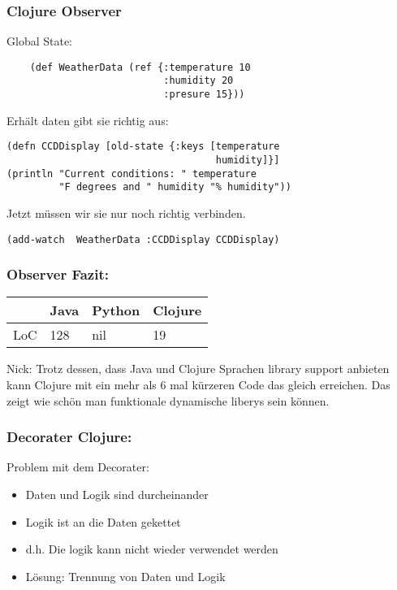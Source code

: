 \documentclass[compress, blue]{beamer}
\begin{document}
\begin{frame}[fragile]\frametitle{Clojure Observer}

Global State:
  \begin{lstlisting}
    (def WeatherData (ref {:temperature 10 
                           :humidity 20 
                           :presure 15}))
  \end{lstlisting}
\pause
Erhält daten gibt sie richtig aus:
\pause
\begin{lstlisting}
(defn CCDDisplay [old-state {:keys [temperature 
                                    humidity]}]
(println "Current conditions: " temperature 
         "F degrees and " humidity "% humidity"))
\end{lstlisting}
\pause
Jetzt müssen wir sie nur noch richtig verbinden.
\pause
\begin{lstlisting}
(add-watch  WeatherData :CCDDisplay CCDDisplay)
\end{lstlisting}
\end{frame}






\begin{frame}\frametitle{Observer Fazit:}
    \begin{tabular}{l | l l l}
     & Java &  Python & Clojure  \\
     \hline
    LoC & 128 &  nil & 19  \\
  \end{tabular}
  
  \begin{block}{Nick:}
    Trotz dessen, dass Java und Clojure Sprachen library support anbieten kann
    Clojure mit ein mehr als 6 mal kürzeren Code das gleich
    erreichen. Das zeigt wie schön man funktionale dynamische liberys
    sein können.
  \end{block}
\end{frame}





\begin{frame}\frametitle{Decorater Clojure:}

  \begin{block}{Problem mit dem Decorater:}
    \begin{itemize}
    \item Daten und Logik sind durcheinander
    \item Logik ist an die Daten gekettet
    \item d.h. Die logik kann nicht wieder verwendet werden
    \item Lösung: Trennung von Daten und Logik
    \end{itemize}
  \end{block}
\end{frame}
\end{document}
